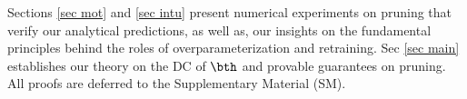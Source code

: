 


Sections \ref{sec mot} and \ref{sec intu} present numerical experiments on pruning that verify our analytical predictions, as well as, our insights on the fundamental principles behind the roles of overparameterization and retraining. Sec \ref{sec main} establishes our theory on the DC of $\bth$ and provable guarantees on pruning. All proofs are deferred to the Supplementary Material (SM).%

